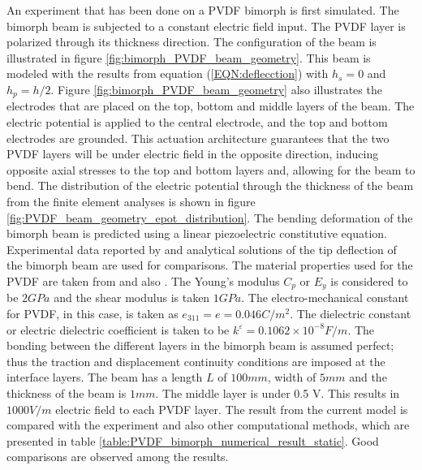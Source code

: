 An experiment that has been done on a PVDF bimorph is first simulated.
The bimorph beam is subjected to a constant electric field input.
The PVDF layer is polarized through its thickness direction.
The configuration of the beam is illustrated in figure \ref{fig:bimorph_PVDF_beam_geometry}.
This beam is modeled with the results from equation (\ref{EQN:deflecction}) with $h_s=0$ and $h_p=h/2$.
Figure \ref{fig:bimorph_PVDF_beam_geometry} also illustrates the electrodes that are placed on the top, bottom and middle layers of the beam.
The electric potential is applied to the central electrode, and the top and bottom electrodes are grounded.
This actuation architecture guarantees that the two PVDF layers will be under electric field in the opposite direction, inducing opposite axial stresses to the top and bottom layers and,
allowing for the beam to bend.
The distribution of the electric potential through the thickness of the beam from the finite element analyses is shown in figure \ref{fig:PVDF_beam_geometry_epot_distribution}.
The bending deformation of the bimorph beam is predicted using a linear piezoelectric constitutive equation.
Experimental data reported by \cite{tzou1991distributed} and analytical solutions \cite{raey,franco2000modelling,suleman1995simple} of the tip deflection of the bimorph beam are used for comparisons.
The material properties used for the PVDF are taken from \cite{suleman1995simple} and also \cite{franco2000modelling}.
The Young's modulus $C_p$ or $E_y$ is considered to be $2 GPa$ and the shear modulus is taken $1GPa$.
The electro-mechanical constant for PVDF, in this case, is taken as $e_{311}=e=0.046 C/m^2$.
The dielectric constant or electric dielectric coefficient is taken to be $ k^\varepsilon = 0.1062 \times 10^{-8} F/m$.
The bonding between the different layers in the bimorph beam is assumed perfect;
thus the traction and displacement continuity conditions are imposed at the interface layers.
The beam has a length $L$ of $100mm$, width of $5mm$ and the thickness of the beam is $1mm$.
The middle layer is under 0.5 V.
This results in $1000 V/m$ electric field to each PVDF layer.
The result from the current model is compared with the experiment and also other computational methods, which are presented in table \ref{table:PVDF_bimorph_numerical_result_static}.
Good comparisons are observed among the results.

